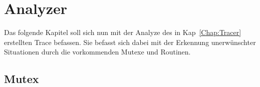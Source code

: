
\chapter{Analyzer} \label{Chap:Implement}

Das folgende Kapitel soll sich nun mit der Analyze des in Kap~\ref{Chap:Tracer} erstellten 
Trace befassen. Sie befasst sich dabei mit der Erkennung unerwünschter Situationen 
durch die vorkommenden Mutexe und Routinen. 







\section{Mutex} \label{Chap:Implement-Sec:Mutex}







